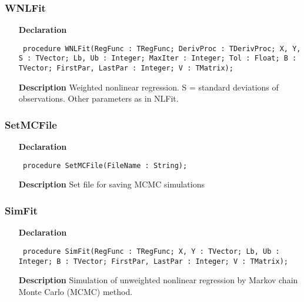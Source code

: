 \documentclass[12pt,a4paper,oneside]{report}
\newcommand{\declarationitem}[1]{\textbf{#1}}
\newcommand{\descriptiontitle}[1]{\textbf{#1}}
\newcommand{\code}[1]{\texttt{#1}}
\begin{document}
\subsubsection{WNLFit}
\label{unlfit-WNLFit}
\begin{itemize}\item[\declarationitem{Declaration}\hfill]
	\begin{flushleft}
		\code{
			procedure WNLFit(RegFunc : TRegFunc; DerivProc : TDerivProc; X, Y, S : TVector; Lb, Ub : Integer; MaxIter : Integer; Tol : Float; B : TVector; FirstPar, LastPar : Integer; V : TMatrix);}
		
	\end{flushleft}
	
	\par
	\item[\descriptiontitle{Description}]
	Weighted nonlinear regression. S = standard deviations of observations. Other parameters as in NLFit.
	
\end{itemize}
\subsubsection{SetMCFile}
\label{unlfit-SetMCFile}
\begin{itemize}\item[\declarationitem{Declaration}\hfill]
	\begin{flushleft}
		\code{
			procedure SetMCFile(FileName : String);}
		
	\end{flushleft}
	
	\par
	\item[\descriptiontitle{Description}]
	Set file for saving MCMC simulations
	
\end{itemize}
\subsubsection{SimFit}
\label{unlfit-SimFit}
\begin{itemize}\item[\declarationitem{Declaration}\hfill]
	\begin{flushleft}
		\code{
			procedure SimFit(RegFunc : TRegFunc; X, Y : TVector; Lb, Ub : Integer; B : TVector; FirstPar, LastPar : Integer; V : TMatrix);}
		
	\end{flushleft}
	
	\par
	\item[\descriptiontitle{Description}]
	Simulation of unweighted nonlinear regression by Markov chain Monte Carlo (MCMC) method.
	
\end{itemize}
\end{document}
